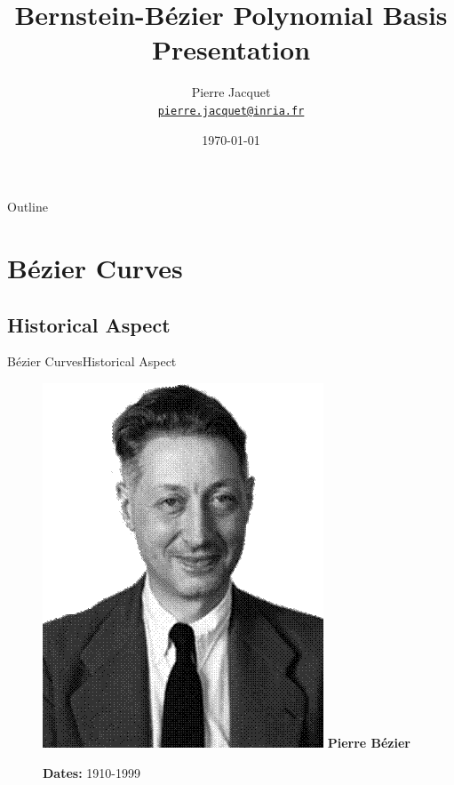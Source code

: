 \documentclass[10pt]{beamer}
\title{Bernstein-Bézier Polynomial Basis Presentation}
\date{\today}
\author{
  Pierre Jacquet\\
  \href{mailto:pierre.jacquet@inria.fr}{{\tt pierre.jacquet@inria.fr}}
}
\institute[
  First year PhD Student\\
  Inria - Magique 3D - DIP\\
  Pau, FRANCE
] %
{%
   First year PhD Student\\
   Inria - Magique 3D - DIP\\
  Pau, FRANCE
}
\begin{document}
{\aauwavesbg%
\begin{frame} %
  \titlepage
\end{frame}}

\begin{frame}{Outline}{}
\tableofcontents
\end{frame}
\section{Bézier Curves}
\subsection{Historical Aspect}
\begin{frame}{Bézier Curves}{Historical Aspect}

  \vspace{-1.5cm}
  \begin{figure}[H]
    \begin{minipage}[top]{0.30\linewidth}
      \centering
      \includegraphics[scale=0.2]{pierre.png}
      \textbf{Pierre Bézier \footnotemark[1]}
    \end{minipage}
    \begin{minipage}[top]{0.65\linewidth}


      \hspace{2cm}
      \textbf{Dates:} \hspace{0.94cm} 1910-1999



\end{minipage}
\end{figure}
\end{frame}
\end{document}

